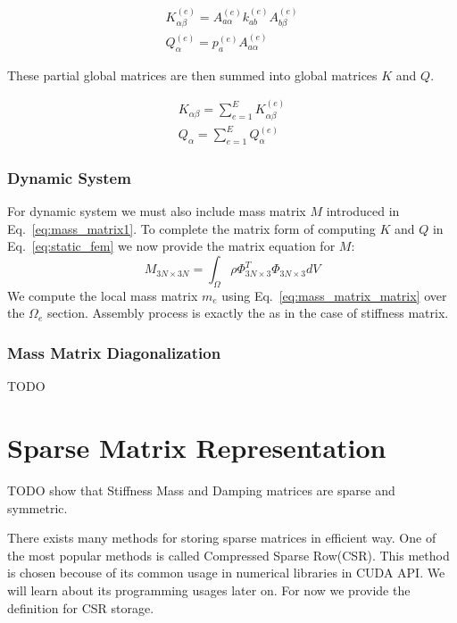 \documentclass[en]{minipw} %
\begin{document}
\begin{equation}
\begin{aligned}
K^{(e)}_{\alpha \beta} =  A^{(e)}_{a \alpha} k^{(e)}_{a b} A^{(e)}_{b \beta}
\\
Q^{(e)}_{\alpha} =  p^{(e)}_{a} A^{(e)}_{a \alpha}
\end{aligned}
\end{equation}

These partial global matrices are then summed into global matrices $K$ and $Q$.

\begin{equation}
\begin{aligned}
K_{\alpha \beta} =  \sum^{E}_{e=1} K^{(e)}_{\alpha \beta}
\\
Q_{\alpha} =  \sum^{E}_{e=1} Q^{(e)}_{\alpha}
\end{aligned}
\end{equation}

\subsubsection{Dynamic System}
For dynamic system we must also include mass matrix $M$ introduced in Eq.~\ref{eq:mass_matrix1}. To complete the matrix form of computing $K$ and $Q$ in Eq.~\ref{eq:static_fem} we now provide the matrix equation for $M$:
\begin{equation}
\label{eq:mass_matrix_matrix}
M_{3N \times 3N} =  \int_{\Omega} \rho \Phi^{T}_{3N \times 3} \Phi_{3N \times 3} dV
\end{equation}
We compute the local mass matrix $m_{e}$ using Eq.~\ref{eq:mass_matrix_matrix} over the $\Omega_{e}$ section. Assembly process is exactly the as in the case of stiffness matrix.

\subsubsection{Mass Matrix Diagonalization}
TODO

\section{Sparse Matrix Representation}
TODO show that Stiffness Mass and Damping matrices are sparse and symmetric.

There exists many methods for storing sparse matrices in efficient way. One of the most popular methods is called Compressed Sparse Row(CSR). This method is chosen becouse of its common usage in numerical libraries in CUDA API. We will learn about its programming usages later on. For now we provide the definition for CSR storage.
\end{document}
